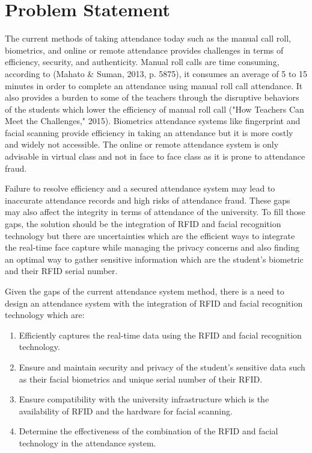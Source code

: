 \section{Problem Statement}
The current methods of taking attendance today such as the manual call roll, biometrics, and online or remote attendance provides challenges in terms of efficiency, security, and authenticity. Manual roll calls are time consuming, according to (Mahato \& Suman, 2013, p. 5875), it consumes an average of 5 to 15 minutes in order to complete an attendance using manual roll call attendance. It also provides a burden to some of the teachers through the disruptive behaviors of the students which lower the efficiency of manual roll call ("How Teachers Can Meet the Challenges," 2015). Biometrics attendance systems like fingerprint and facial scanning provide efficiency in taking an attendance but it is more costly and widely not accessible. The online or remote attendance system is only advisable in virtual class and not in face to face class as it is prone to attendance fraud.

Failure to resolve efficiency and a secured attendance system may lead to inaccurate attendance records and high risks of attendance fraud. These gaps may also affect the integrity in terms of attendance of the university. To fill those gaps, the solution should be the integration of RFID and facial recognition technology but there are uncertainties which are the efficient ways to integrate the real-time face capture while  managing the privacy concerns and also finding an optimal way to gather sensitive information which are the student’s biometric and their RFID serial number. 

Given the gaps of the current attendance system method, there is a need to design an attendance system with the integration of RFID and facial recognition technology which are:

\begin{enumerate}
	\item Efficiently captures the real-time data using the RFID and facial recognition technology.
	\item  Ensure and maintain security and privacy of the student’s sensitive data such as their facial biometrics and unique serial number of their RFID.  
	\item Ensure compatibility with the university infrastructure which is the availability of RFID and the hardware for facial scanning. 
	\item 	Determine the effectiveness of the combination of the RFID and facial technology in the attendance system. 
\end{enumerate}


